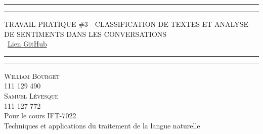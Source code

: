 \begin{titlepage}
	\centering %
	
	\scshape %
	
	\vspace*{\baselineskip} %
	
	
	\rule{\textwidth}{1.6pt}\vspace*{-\baselineskip}\vspace*{2pt} %
	\rule{\textwidth}{0.4pt} %
	
	\vspace{0.75\baselineskip} %
	
	{\LARGE TRAVAIL	PRATIQUE \#3 - CLASSIFICATION DE TEXTES ET ANALYSE DE SENTIMENTS DANS LES CONVERSATIONS\\} %
	\vspace{0.5\baselineskip} %
	\ 
	\href{https://github.com/Samuel-Levesque/ift-7022_devoir_3}{Lien GitHub}
	\vspace{0.75\baselineskip} %
	
	\rule{\textwidth}{0.4pt}\vspace*{-\baselineskip}\vspace{3.2pt} %
	\rule{\textwidth}{1.6pt} %
	
	\vspace{2\baselineskip} %
	
	{\scshape\Large William Bourget\\111 129 490\\Samuel Lévesque\\111 127 772\\} %
	\vspace{0.5\baselineskip} %
	Pour le cours IFT-7022\\
	Techniques et applications du traitement de la langue naturelle \\%
	

\end{titlepage}
